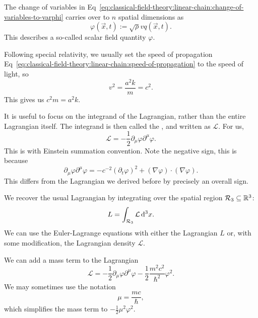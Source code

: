 The change of variables in
Eq~\eqref{eq:classical-field-theory:linear-chain:change-of-variables-to-varphi}
carries over to $n$ spatial dimensions as
\begin{equation}
\varphi(\vec{x},t) := \sqrt{\rho}vq(\vec{x},t).
\end{equation}
This describes a so-called scalar field quantity $\varphi$.

Following special relativity, we usually set the speed of propagation Eq~\eqref{eq:classical-field-theory:linear-chain:speed-of-propagation}
to the speed of light, so
\begin{equation}
v^{2} = \frac{a^{2}k}{m} = c^{2}.
\end{equation}
This gives us $c^{2}m=a^{2}k$.

It is useful to focus on the integrand of the Lagrangian, rather than
the entire Lagrangian itself. The integrand is then called the
, and written as $\mathcal{L}$. For us,
\begin{equation}
\mathcal{L} = -\frac{1}{2}\partial_{\mu}\varphi\partial^{\mu}\varphi.
\end{equation}
This is with Einstein summation convention. Note the negative sign, this
is because
\begin{equation}
\partial_{\mu}\varphi\partial^{\mu}\varphi = -c^{-2}(\partial_{t}\varphi)^{2}
+(\nabla\varphi)\cdot(\nabla\varphi).
\end{equation}
This differs from the Lagrangian we derived before by precisely an
overall sign.

We recover the usual Lagrangian by integrating over the spatial region $\mathcal{R}_{3}\subseteq\mathbb{R}^{3}$:
\begin{equation}
L = \int_{\mathcal{R}_{3}}\mathcal{L}\,\mathrm{d}^{3}x.
\end{equation}
We can use the Euler-Lagrange equations with either the Lagrangian $L$
or, with some modification, the Lagrangian density $\mathcal{L}$.

We can add a mass term to the Lagrangian
\begin{equation}\label{eq:classical-field-theory:linear-chain:continuum-limit:mass-term:lagrangian}
\mathcal{L}=-\frac{1}{2}\partial_{\mu}\varphi\partial^{\mu}\varphi-\frac{1}{2}\frac{m^{2}c^{2}}{\hbar^{2}}\varphi^{2}.
\end{equation}
We may sometimes use the notation
\begin{equation}
\mu = \frac{mc}{\hbar},
\end{equation}
which simplifies the mass term to $-\frac{1}{2}\mu^{2}\varphi^{2}$.

